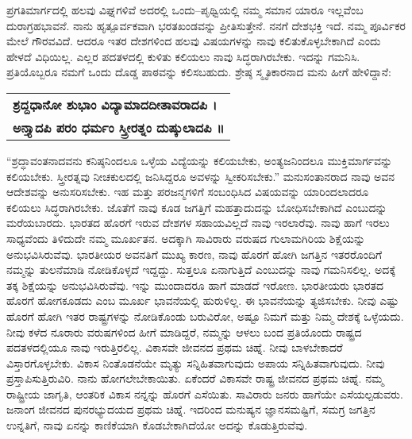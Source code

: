 ಪ್ರಗತಿಮಾರ್ಗದಲ್ಲಿ ಹಲವು ವಿಘ್ನಗಳಿವೆ ಅದರಲ್ಲಿ ಒಂದು–ಪೃಥ್ವಿಯಲ್ಲಿ ನಮ್ಮ ಸಮಾನ ಯಾರೂ ಇಲ್ಲವೆಂಬ ದುರಾಗ್ರಹಭಾವನೆ. ನಾನು ಹೃತ್ಪೂರ್ವಕವಾಗಿ ಭರತಖಂಡವನ್ನು ಪ್ರೀತಿಸುತ್ತೇನೆ. ನನಗೆ ದೇಶಭಕ್ತಿ ಇದೆ. ನಮ್ಮ ಪೂರ್ವಿಕರ ಮೇಲೆ ಗೌರವವಿದೆ. ಆದರೂ ಇತರ ದೇಶಗಳಿಂದ ಹಲವು ವಿಷಯಗಳನ್ನು ನಾವು ಕಲಿತುಕೊಳ್ಳಬೇಕಾಗಿದೆ ಎಂದು ಹೇಳದೆ ವಿಧಿಯಿಲ್ಲ. ಎಲ್ಲರ ಪದತಳದಲ್ಲಿ ಕುಳಿತು ಕಲಿಯಲು ನಾವು ಸಿದ್ಧರಾಗಿರಬೇಕು. ಇದನ್ನು ಗಮನಿಸಿ. ಪ್ರತಿಯೊಬ್ಬರೂ ನಮಗೆ ಒಂದು ದೊಡ್ಡ ಪಾಠವನ್ನು ಕಲಿಸಬಹುದು. ಶ್ರೇಷ್ಠ ಸ್ಮೃತಿಕಾರನಾದ ಮನು ಹೀಗೆ ಹೇಳಿದ್ದಾನೆ:

\begin{longtable}{@{}l@{}}
\textbf{ಶ್ರದ್ದಧಾನೋ ಶುಭಾಂ ವಿದ್ಯಾಮಾದದೀತಾವರಾದಪಿ ।} \\
\textbf{ಅನ್ತ್ಯಾದಪಿ ಪರಂ ಧರ್ಮಂ ಸ್ತ್ರೀರತ್ನಂ ದುಷ್ಕುಲಾದಪಿ ॥} \\
\end{longtable}

“ಶ್ರದ್ಧಾವಂತನಾದವನು ಕನಿಷ್ಠನಿಂದಲೂ ಒಳ್ಳೆಯ ವಿದ್ಯೆಯನ್ನು ಕಲಿಯಬೇಕು, ಅಂತ್ಯಜನಿಂದಲೂ ಮುಕ್ತಿಮಾರ್ಗವನ್ನು ಕಲಿಯಬೇಕು. ಸ್ತ್ರೀರತ್ನವು ನೀಚಕುಲದಲ್ಲಿ ಜನಿಸಿದ್ದರೂ ಅವಳನ್ನು ಸ್ವೀಕರಿಸಬೇಕು.” ಮನುಸಂತಾನರಾದ ನಾವು ಅವನ ಆದೇಶವನ್ನು ಅನುಸರಿಸಬೇಕು. ಇಹ ಮತ್ತು ಪರಜನ್ಮಗಳಿಗೆ ಸಂಬಂಧಿಸಿದ ವಿಷಯವನ್ನು ಯಾರಿಂದಲಾದರೂ ಕಲಿಯಲು ಸಿದ್ಧರಾಗಿರಬೇಕು. ಜೊತೆಗೆ ನಾವು ಕೂಡ ಜಗತ್ತಿಗೆ ಮಹತ್ತಾದುದನ್ನು ಬೋಧಿಸಬೇಕಾಗಿದೆ ಎಂಬುದನ್ನು ಮರೆಯಬಾರದು. ಭಾರತದ ಹೊರಗೆ ಇರುವ ದೇಶಗಳ ಸಹಾಯವಿಲ್ಲದೆ ನಾವು ಇರಲಾರೆವು. ನಾವು ಹಾಗೆ ಇರಲು ಸಾಧ್ಯವೆಂದು ತಿಳಿದುದೇ ನಮ್ಮ ಮೂರ್ಖತನ. ಅದಕ್ಕಾಗಿ ಸಾವಿರಾರು ವರುಷದ ಗುಲಾಮಗಿರಿಯ ಶಿಕ್ಷೆಯನ್ನು ಅನುಭವಿಸಿರುವೆವು. ಭಾರತೀಯರ ಅವನತಿಗೆ ಮುಖ್ಯ ಕಾರಣ, ನಾವು ಹೊರಗೆ ಹೋಗಿ ಜಗತ್ತಿನ ಇತರರೊಂದಿಗೆ ನಮ್ಮನ್ನು ತುಲನೆಮಾಡಿ ನೋಡಿಕೊಳ್ಳದೆ ಇದ್ದದ್ದು. ಸುತ್ತಲೂ ಏನಾಗುತ್ತಿದೆ ಎಂಬುದನ್ನು ನಾವು ಗಮನಿಸಲಿಲ್ಲ. ಅದಕ್ಕೆ ತಕ್ಕ ಶಿಕ್ಷೆಯನ್ನು ಅನುಭವಿಸಿರುವೆವು. ಇನ್ನು ಮುಂದಾದರೂ ಹಾಗೆ ಮಾಡದೆ ಇರೋಣ. ಭಾರತೀಯರು ಭಾರತದ ಹೊರಗೆ ಹೋಗಕೂಡದು ಎಂಬ ಮೂರ್ಖ ಭಾವನೆಯಲ್ಲಿ ಹುರುಳಿಲ್ಲ. ಈ ಭಾವನೆಯನ್ನು ತ್ಯಜಿಸಬೇಕು. ನೀವು ಎಷ್ಟು ಹೊರಗೆ ಹೋಗಿ ಇತರ ರಾಷ್ಟ್ರಗಳನ್ನು ನೋಡಿಕೊಂಡು ಬರುವಿರೋ, ಅಷ್ಟೂ ನಿಮಗೆ ಮತ್ತು ನಿಮ್ಮ ದೇಶಕ್ಕೆ ಒಳ್ಳೆಯದು. ನೀವು ಕಳೆದ ನೂರಾರು ವರುಷಗಳಿಂದ ಹೀಗೆ ಮಾಡಿದ್ದರೆ, ನಮ್ಮನ್ನು ಆಳಲು ಬಂದ ಪ್ರತಿಯೊಂದು ರಾಷ್ಟ್ರದ ಪದತಳದಲ್ಲಿಯೂ ನಾವು ಇರುತ್ತಿರಲಿಲ್ಲ. ವಿಕಾಸವೇ ಜೀವನದ ಪ್ರಥಮ ಚಿಹ್ನೆ. ನೀವು ಬಾಳಬೇಕಾದರೆ ವಿಸ್ತಾರಗೊಳ್ಳಬೇಕು. ವಿಕಾಸ ನಿಂತೊಡನೆಯೇ ಮೃತ್ಯು ಸನ್ನಿಹಿತವಾಗುವುದು ಅಪಾಯ ಸನ್ನಿಹಿತವಾಗುವುದು. ನೀವು ಪ್ರಸ್ತಾಪಿಸುತ್ತಿರುವಿರಿ. ನಾನು ಹೋಗಲೇಬೇಕಾಯಿತು. ಏಕೆಂದರೆ ವಿಕಾಸವೇ ರಾಷ್ಟ್ರ ಜೀವನದ ಪ್ರಥಮ ಚಿಹ್ನೆ. ನಮ್ಮ ರಾಷ್ಟ್ರೀಯ ಜಾಗೃತಿ, ಆಂತರಿಕ ವಿಕಾಸ ನನ್ನನ್ನು ಹೊರಗೆ ಎಸೆಯಿತು. ಸಾವಿರಾರು ಜನರು ಹಾಗೆಯೇ ಎಸೆಯಲ್ಪಡುವರು. ಜನಾಂಗ ಜೀವನದ ಪುನರಭ್ಯುದಯದ ಪ್ರಥಮ ಚಿಹ್ನೆ. ಇದರಿಂದ ಮನುಷ್ಯನ ಜ್ಞಾನಸಮಷ್ಟಿಗೆ, ಸಮಗ್ರ ಜಗತ್ತಿನ ಉನ್ನತಿಗೆ, ನಾವು ಏನನ್ನು ಕಾಣಿಕೆಯಾಗಿ ಕೊಡಬೇಕಾಗಿದೆಯೋ ಅದನ್ನು ಕೊಡುತ್ತಿರುವೆವು.


